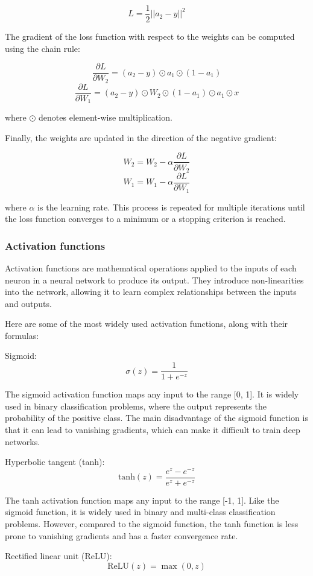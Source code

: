 \documentclass[12pt, a4paper, oneside]{article}
\begin{document}
$$ L = \frac{1}{2} ||a_2 - y||^2 $$

The gradient of the loss function with respect to the weights can be computed using the chain rule:

$$ \frac{\partial L}{\partial W_2} = (a_2 - y) \odot a_1 \odot (1 - a_1) $$
$$ \frac{\partial L}{\partial W_1} = (a_2 - y) \odot W_2 \odot (1 - a_1) \odot a_1 \odot x $$

where $\odot$ denotes element-wise multiplication.

Finally, the weights are updated in the direction of the negative gradient:

$$ W_2 = W_2 - \alpha \frac{\partial L}{\partial W_2} $$
$$ W_1 = W_1 - \alpha \frac{\partial L}{\partial W_1} $$

where $\alpha$ is the learning rate. This process is repeated for multiple iterations until the loss function converges to a minimum or a stopping criterion is reached.
\subsubsection{Activation functions }
Activation functions are mathematical operations applied to the inputs of each neuron in a neural network to produce its output. They introduce non-linearities into the network, allowing it to learn complex relationships between the inputs and outputs.

Here are some of the most widely used activation functions, along with their formulas:

Sigmoid:
$$ \sigma(z) = \frac{1}{1 + e^{-z}} $$

The sigmoid activation function maps any input to the range [0, 1]. It is widely used in binary classification problems, where the output represents the probability of the positive class. The main disadvantage of the sigmoid function is that it can lead to vanishing gradients, which can make it difficult to train deep networks.

Hyperbolic tangent (tanh):
$$ \text{tanh}(z) = \frac{e^z - e^{-z}}{e^z + e^{-z}} $$

The tanh activation function maps any input to the range [-1, 1]. Like the sigmoid function, it is widely used in binary and multi-class classification problems. However, compared to the sigmoid function, the tanh function is less prone to vanishing gradients and has a faster convergence rate.

Rectified linear unit (ReLU):
$$ \text{ReLU}(z) = \max(0, z) $$
\end{document}
